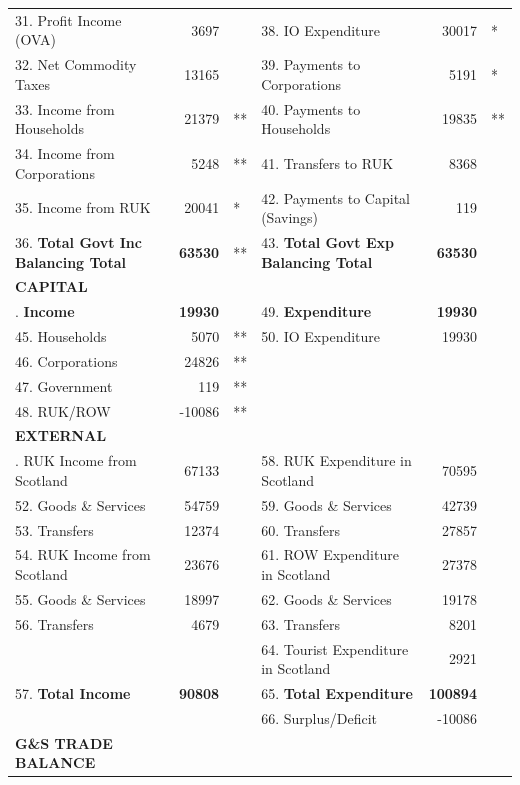 \begin{table}[H]
\begin{scriptsize}
\begin{centering}
\begin{spacing}{1.2}
\begin{tabular}{lrllrl}
       31. Profit Income (OVA) & 3697 & & 38. IO Expenditure & 30017 & * \\
       32. Net Commodity Taxes & 13165 & & 39. Payments to Corporations & 5191 &* \\
       33. Income from Households & 21379 &** & 40. Payments to Households & 19835 &** \\
       34. Income from Corporations & 5248 &** & 41. Transfers to RUK & 8368 & \\
       35. Income from RUK & 20041 &* & 42. Payments to Capital (Savings) & 119 & \\
       36. \textbf{Total Govt Inc Balancing Total} & \textbf{63530} &** & 43. \textbf{Total Govt Exp Balancing Total} & \textbf{63530} &  \\ 
    \hline
    \textbf{CAPITAL} \bigstrut\\
    \hline
\bigstrut[t]       44. \textbf{Income} & \textbf{19930}  &   & 49. \textbf{Expenditure} & \textbf{19930} & \\
       45. Households & 5070 &** & 50. IO Expenditure & 19930 &  \\
       46. Corporations & 24826 &** &  \\
       47. Government & 119 &** &  \\
       48. RUK/ROW & -10086 &** &  \\ 
    \hline
    \textbf{EXTERNAL} \bigstrut\\
    \hline
\bigstrut[t]  51. RUK Income from Scotland & 67133  &   & 58. RUK Expenditure in Scotland & 70595 & \\
       52. Goods \& Services & 54759 & & 59. Goods \& Services & 42739 & \\
       53. Transfers & 12374 & & 60. Transfers & 27857 & \\
       54. RUK Income from Scotland & 23676 & & 61. ROW Expenditure in Scotland & 27378 & \\
       55. Goods \& Services & 18997 & & 62. Goods \& Services & 19178 & \\
       56. Transfers & 4679 & & 63. Transfers & 8201 & \\
       & & & 64. Tourist Expenditure in Scotland & 2921 & \\
       57. \textbf{Total Income} & \textbf{90808} & & 65. \textbf{Total Expenditure} & \textbf{100894} &  \\  
        & & & 66. Surplus/Deficit &-10086 & \\   
    \hline
    \textbf{G\&S TRADE BALANCE} \bigstrut\\

\end{tabular}
\end{spacing}
\end{centering}
\end{scriptsize}
\end{table}

